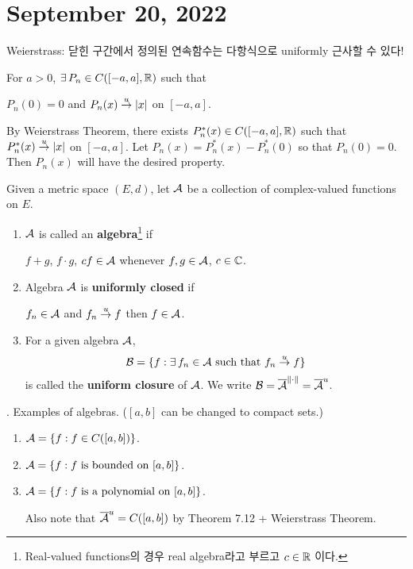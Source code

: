 \section*{September 20, 2022}

Weierstrass: 닫힌 구간에서 정의된 연속함수는 다항식으로 uniformly 근사할 수 있다!

\cor For \(a > 0\), \(\exists P_n \in C([-a, a], \R)\) such that
\begin{center}
    \(P_n(0) = 0\) and \(P_n(x) \overset{u}{\rightarrow} \left| x \right|\) on \([-a, a]\).
\end{center}

\pf By Weierstrass Theorem, there exists \(P_n^\ast(x) \in C([-a, a], \mathbb{R})\) such that \(P_n^\ast(x) \overset{u}{\rightarrow} \left| x \right|\) on \([-a, a]\). Let \(P_n(x) = P_n^\ast(x) - P_n^*(0)\) so that \(P_n(0) = 0\). Then \(P_n(x)\) will have the desired property.

\medskip

 Given a metric space \((E, d)\), let \(\mathcal{A}\) be a collection of complex-valued functions on \(E\).
\begin{enumerate}
    \item \(\mathcal{A}\) is called an \textbf{algebra}\footnote{Real-valued functions의 경우 real algebra라고 부르고 \(c \in \mathbb{R}\) 이다.} if
          \begin{center}
              \(f+g\), \(f\cdot g\), \(cf \in \mathcal{A}\) whenever \(f, g \in \mathcal{A}\), \(c \in \mathbb{C}\).
          \end{center}
    \item Algebra \(\mathcal{A}\) is \textbf{uniformly closed} if
          \begin{center}
              \(f_n \in \mathcal{A}\) and \(f_n \overset{u}{\rightarrow} f\) then \(f \in \mathcal{A}\).
          \end{center}
    \item For a given algebra \(\mathcal{A}\),
          \[
              \mc{B} = \{f : \exists f_n \in \mc{A} \text{ such that } f_n\uc f\}
          \]
          is called the \textbf{uniform closure} of \(\mathcal{A}\). We write \(\mathcal{B} = \overline{\mathcal{A}}^{\left\lVert \cdot \right\rVert} = \overline{\mathcal{A}}^u\).
\end{enumerate}

\ex. Examples of algebras. (\([a, b]\) can be changed to compact sets.)
\begin{enumerate}
    \item \(\mathcal{A} = \{f : f \in C([a, b])\}\).
    \item \(\mathcal{A} = \{f : f \text{ is bounded on } [a, b]\}\).
    \item \(\mathcal{A} = \{f : f \text{ is a polynomial on } [a, b]\}\).

          Also note that \(\overline{\mathcal{A}}^u = C([a, b])\) by Theorem 7.12 + Weierstrass Theorem.
\end{enumerate}


